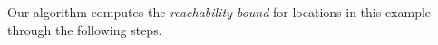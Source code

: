 
Our algorithm computes the \emph{reachability-bound} for locations in this example through the following steps.

